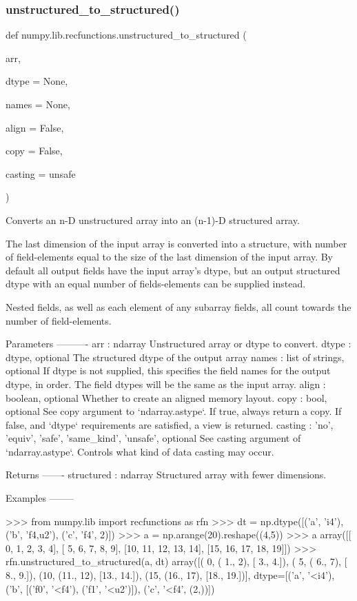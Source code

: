 \subsubsection{\texorpdfstring{unstructured\+\_\+to\+\_\+structured()}{unstructured\_to\_structured()}}
{\footnotesize\ttfamily def numpy.\+lib.\+recfunctions.\+unstructured\+\_\+to\+\_\+structured (\begin{DoxyParamCaption}\item[{}]{arr,  }\item[{}]{dtype = {\ttfamily None},  }\item[{}]{names = {\ttfamily None},  }\item[{}]{align = {\ttfamily False},  }\item[{}]{copy = {\ttfamily False},  }\item[{}]{casting = {\ttfamily \textquotesingle{}unsafe\textquotesingle{}} }\end{DoxyParamCaption})}

\begin{DoxyVerb}Converts an n-D unstructured array into an (n-1)-D structured array.

The last dimension of the input array is converted into a structure, with
number of field-elements equal to the size of the last dimension of the
input array. By default all output fields have the input array's dtype, but
an output structured dtype with an equal number of fields-elements can be
supplied instead.

Nested fields, as well as each element of any subarray fields, all count
towards the number of field-elements.

Parameters
----------
arr : ndarray
   Unstructured array or dtype to convert.
dtype : dtype, optional
   The structured dtype of the output array
names : list of strings, optional
   If dtype is not supplied, this specifies the field names for the output
   dtype, in order. The field dtypes will be the same as the input array.
align : boolean, optional
   Whether to create an aligned memory layout.
copy : bool, optional
    See copy argument to `ndarray.astype`. If true, always return a copy.
    If false, and `dtype` requirements are satisfied, a view is returned.
casting : {'no', 'equiv', 'safe', 'same_kind', 'unsafe'}, optional
    See casting argument of `ndarray.astype`. Controls what kind of data
    casting may occur.

Returns
-------
structured : ndarray
   Structured array with fewer dimensions.

Examples
--------

>>> from numpy.lib import recfunctions as rfn
>>> dt = np.dtype([('a', 'i4'), ('b', 'f4,u2'), ('c', 'f4', 2)])
>>> a = np.arange(20).reshape((4,5))
>>> a
array([[ 0,  1,  2,  3,  4],
       [ 5,  6,  7,  8,  9],
       [10, 11, 12, 13, 14],
       [15, 16, 17, 18, 19]])
>>> rfn.unstructured_to_structured(a, dt)
array([( 0, ( 1.,  2), [ 3.,  4.]), ( 5, ( 6.,  7), [ 8.,  9.]),
       (10, (11., 12), [13., 14.]), (15, (16., 17), [18., 19.])],
      dtype=[('a', '<i4'), ('b', [('f0', '<f4'), ('f1', '<u2')]), ('c', '<f4', (2,))])\end{DoxyVerb}
 